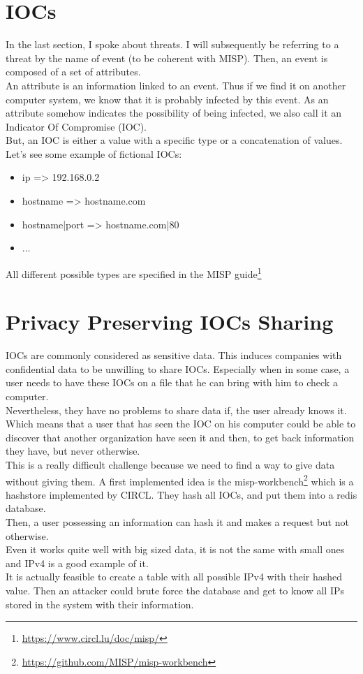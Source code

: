 \documentclass[10pt]{article}
\begin{document}
\section{IOCs}
In the last section, I spoke about threats. I will subsequently be referring to a threat by the name of event (to be coherent with MISP). Then, an event is composed of a set of attributes. \\
An attribute is an information linked to an event. Thus if we find it on another computer system, we know that it is probably infected by this event. As an attribute somehow indicates the possibility of being infected, we also call it an Indicator Of Compromise (IOC).\\
But, an IOC is either a value with a specific type or a concatenation of values. Let's see some example of fictional IOCs:
\begin{itemize}
\item ip => 192.168.0.2
\item hostname => hostname.com
\item hostname|port => hostname.com|80
\item ...
\end{itemize} 
All different possible types are specified in the MISP guide\footnote{\url{https://www.circl.lu/doc/misp/}}

\section{Privacy Preserving IOCs Sharing}
IOCs are commonly considered as sensitive data. This induces companies with confidential data to be unwilling to share IOCs. Especially when in some case, a user needs to have these IOCs on a file that he can bring with him to check a computer.\\
Nevertheless, they have no problems to share data if, the user already knows it. Which means that a user that has seen the IOC on his computer could be able to discover that another organization have seen it and then, to get back information they have, but never otherwise.\\

This is a really difficult challenge because we need to find a way to give data without giving them. A first implemented idea is the misp-workbench\footnote{\url{https://github.com/MISP/misp-workbench}} which is a hashstore implemented by CIRCL. They hash all IOCs, and put them into a redis database.\\
Then, a user possessing an information can hash it and makes a request but not otherwise.\\
Even it works quite well with big sized data, it is not the same with small ones and IPv4 is a good example of it.\\
It is actually feasible to create a table with all possible IPv4 with their hashed value. Then an attacker could brute force the database and get to know all IPs stored in the system with their information.\\
\end{document}
